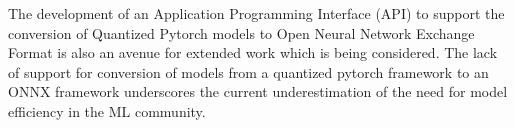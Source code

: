 \documentclass{sigchi}
\begin{document}
\par The development of an Application Programming Interface (API) to support the conversion of Quantized Pytorch models to Open Neural Network Exchange Format is also an avenue for extended work which is being considered. The lack of support for conversion of models from a quantized pytorch framework to an ONNX framework underscores the current underestimation of the need for model efficiency in the ML community.







\end{document}
